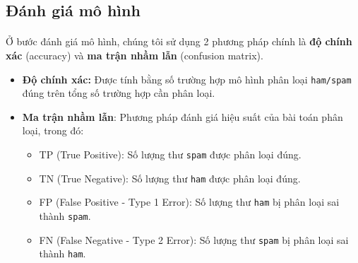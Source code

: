 {\subsection{Đánh giá mô hình}

\paragraph{}{Ở bước đánh giá mô hình, chúng tôi sử dụng 2 phương pháp chính là \textbf{độ chính xác} (accuracy) và \textbf{ma trận nhầm lẫn} (confusion matrix).}
\begin{itemize}
    \item \textbf{Độ chính xác:} Được tính bằng số trường hợp mô hình phân loại \texttt{ham/spam} đúng trên tổng số trường hợp cần phân loại.
    \item \textbf{Ma trận nhầm lẫn}: Phương pháp đánh giá hiệu suất của bài toán phân loại, trong đó:
    \begin{itemize}
        \item TP (True Positive): Số lượng thư \texttt{spam} được phân loại đúng. 
        \item TN (True Negative): Số lượng thư \texttt{ham} được phân loại đúng. 
        \item FP (False Positive - Type 1 Error): Số lượng thư \texttt{ham} bị phân loại sai thành \texttt{spam}. 
        \item FN (False Negative - Type 2 Error): Số lượng thư \texttt{spam} bị phân loại sai thành \texttt{ham}. 
    \end{itemize}
\end{itemize}

\begin{figure}[H] 
    \centering 


\end{figure}}
